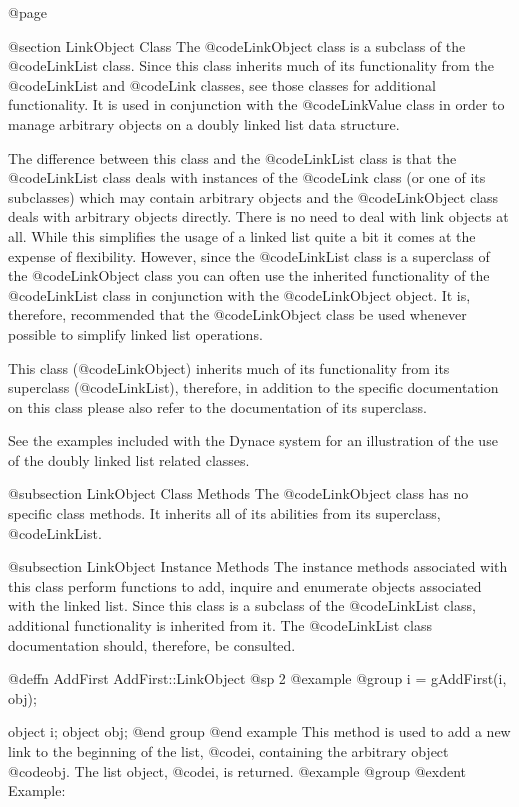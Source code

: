 @page

@section LinkObject Class
The @code{LinkObject} class is a subclass of the @code{LinkList} class.
Since this class inherits much of its functionality from the
@code{LinkList} and @code{Link} classes, see those classes for
additional functionality.  It is used in conjunction with the
@code{LinkValue} class in order to manage arbitrary objects on a doubly
linked list data structure.

The difference between this class and the @code{LinkList} class is that
the @code{LinkList} class deals with instances of the @code{Link} class
(or one of its subclasses) which may contain arbitrary objects and the
@code{LinkObject} class deals with arbitrary objects directly.  There is
no need to deal with link objects at all.  While this simplifies the
usage of a linked list quite a bit it comes at the expense of
flexibility.  However, since the @code{LinkList} class is a superclass
of the @code{LinkObject} class you can often use the inherited
functionality of the @code{LinkList} class in conjunction with the
@code{LinkObject} object.  It is, therefore, recommended that the
@code{LinkObject} class be used whenever possible to simplify linked
list operations.

This class (@code{LinkObject}) inherits much of its functionality from its
superclass (@code{LinkList}), therefore, in addition to the specific
documentation on this class please also refer to the documentation of
its superclass.

See the examples included with the Dynace system for an illustration of the
use of the doubly linked list related classes.



@subsection LinkObject Class Methods
The @code{LinkObject} class has no specific class methods.  It inherits
all of its abilities from its superclass, @code{LinkList}.


@subsection LinkObject Instance Methods
The instance methods associated with this class perform functions to
add, inquire and enumerate objects associated with the linked list.
Since this class is a subclass of the @code{LinkList} class, additional
functionality is inherited from it.  The @code{LinkList} class
documentation should, therefore, be consulted.






@deffn {AddFirst} AddFirst::LinkObject
@sp 2
@example
@group
i = gAddFirst(i, obj);

object  i;
object  obj;
@end group
@end example
This method is used to add a new link to the beginning of the list,
@code{i}, containing the arbitrary object @code{obj}.  The list object,
@code{i}, is returned.
@example
@group
@exdent Example:

